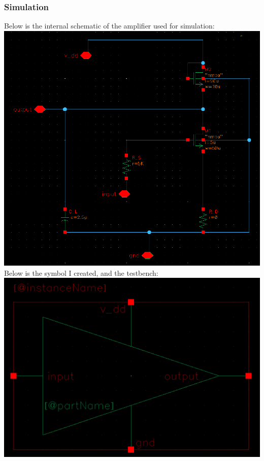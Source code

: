 \documentclass[12pt, fleqn]{article}
\begin{document}
\subsubsection{Simulation}
Below is the internal schematic of the amplifier used for simulation:\\[0.1cm]
\includegraphics[scale=0.4, center]{a_internal.png}\\
Below is the symbol I created, and the testbench:\\[0.1cm]
\includegraphics[scale=0.15, center]{a_symbol.png}
\quad
\end{document}
